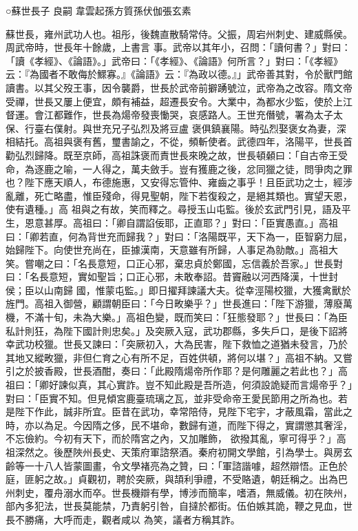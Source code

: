 
\begin{pinyinscope}

 ○蘇世長子
 良嗣
 韋雲起孫方質孫伏伽張玄素



 蘇世長，雍州武功人也。祖彤，後魏直散騎常侍。父振，周宕州刺史、建威縣侯。周武帝時，世長年十餘歲，上書言
 事。武帝以其年小，召問：「讀何書？」對曰：「讀《孝經》、《論語》。」武帝曰：「《孝經》、《論語》何所言？」對曰：「《孝經》云：『為國者不敢侮於鰥寡。』《論語》云：『為政以德。』」武帝善其對，令於獸門館讀書。以其父歿王事，因令襲爵，世長於武帝前擗踴號泣，武帝為之改容。隋文帝受禪，世長又屢上便宜，頗有補益，超遷長安令。大業中，為都水少監，使於上江督運。會江都難作，世長為煬帝發喪慟哭，哀感路人。王世充僭號，署為太子太保、行臺右僕射。與世充兄子弘烈及將豆盧
 褒俱鎮襄陽。時弘烈娶褒女為妻，深相結托。高祖與褒有舊，璽書諭之，不從，頻斬使者。武德四年，洛陽平，世長首勸弘烈歸降。既至京師，高祖誅褒而責世長來晚之故，世長頓顙曰：「自古帝王受命，為逐鹿之喻，一人得之，萬夫斂手。豈有獲鹿之後，忿同獵之徒，問爭肉之罪也？陛下應天順人，布德施惠，又安得忘管仲、雍齒之事乎！且臣武功之士，經涉亂離，死亡略盡，惟臣殘命，得見聖朝，陛下若復殺之，是絕其類也。實望天恩，使有遺種。」高
 祖與之有故，笑而釋之。尋授玉山屯監。後於玄武門引見，語及平生，恩意甚厚。高祖曰：「卿自謂諂佞耶，正直耶？」對曰：「臣實愚直。」高祖曰：「卿若直，何為背世充而歸我？」對曰：「洛陽既平，天下為一，臣智窮力屈，始歸陛下。向使世充尚在，臣據漢南，天意雖有所歸，人事足為勍敵。」高祖大笑。嘗嘲之曰：「名長意短，口正心邪，棄忠貞於鄭國，忘信義於吾家。」世長對曰：「名長意短，實如聖旨；口正心邪，未敢奉詔。昔竇融以河西降漢，十世封侯；臣以山南歸
 國，惟蒙屯監。」即日擢拜諫議大夫。從幸涇陽校獵，大獲禽獸於旌門。高祖入御營，顧謂朝臣曰：「今日畋樂乎？」世長進曰：「陛下游獵，薄廢萬機，不滿十旬，未為大樂。」高祖色變，既而笑曰：「狂態發耶？」世長曰：「為臣私計則狂，為陛下國計則忠矣。」及突厥入寇，武功郡縣，多失戶口，是後下詔將幸武功校獵。世長又諫曰：「突厥初入，大為民害，陛下救恤之道猶未發言，乃於其地又縱畋獵，非但仁育之心有所不足，百姓供頓，將何以堪？」高祖不納。又嘗
 引之於披香殿，世長酒酣，奏曰：「此殿隋煬帝所作耶？是何雕麗之若此也？」高祖曰：「卿好諫似真，其心實詐。豈不知此殿是吾所造，何須設詭疑而言煬帝乎？」對曰：「臣實不知。但見傾宮鹿臺琉璃之瓦，並非受命帝王愛民節用之所為也。若是陛下作此，誠非所宜。臣昔在武功，幸常陪侍，見陛下宅宇，才蔽風霜，當此之時，亦以為足。今因隋之侈，民不堪命，數歸有道，而陛下得之，實謂懲其奢淫，不忘儉約。今初有天下，而於隋宮之內，又加雕飾，
 欲撥其亂，寧可得乎？」高祖深然之。後歷陜州長史、天策府軍諮祭酒。秦府初開文學館，引為學士。與房玄齡等一十八人皆蒙圖畫，令文學褚亮為之贊，曰：「軍諮諧噱，超然辯悟。正色於庭，匪躬之故。」貞觀初，聘於突厥，與頡利爭禮，不受賂遺，朝廷稱之。出為巴州刺史，覆舟溺水而卒。世長機辯有學，博涉而簡率，嗜酒，無威儀。初在陜州，部內多犯法，世長莫能禁，乃責躬引咎，自撻於都街。伍伯嫉其詭，鞭之見血，世長不勝痛，大呼而走，觀者咸以
 為笑，議者方稱其詐。




\end{pinyinscope}
